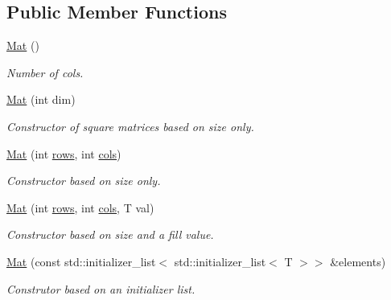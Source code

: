 \subsection*{Public Member Functions}
\begin{DoxyCompactItemize}
\item 
\mbox{\label{classtao_1_1deprecated_1_1_mat_af0fe0033ada296c7f0166b78e705ebc1}} 
\mbox{\hyperlink{classtao_1_1deprecated_1_1_mat_af0fe0033ada296c7f0166b78e705ebc1}{Mat}} ()
\begin{DoxyCompactList}\small\item\em Number of cols. \end{DoxyCompactList}\item 
\mbox{\hyperlink{classtao_1_1deprecated_1_1_mat_af505e5fdfcff8448c86fcf3d630c53a7}{Mat}} (int dim)
\begin{DoxyCompactList}\small\item\em Constructor of square matrices based on size only. \end{DoxyCompactList}\item 
\mbox{\hyperlink{classtao_1_1deprecated_1_1_mat_a9a367235a9d0a78d1e49cf6fdc09f620}{Mat}} (int \mbox{\hyperlink{classtao_1_1deprecated_1_1_mat_aefbe18686fd37ac1d5525196649282c8}{rows}}, int \mbox{\hyperlink{classtao_1_1deprecated_1_1_mat_a987003b3e2bc3cd6b9776c6bcaed8dd2}{cols}})
\begin{DoxyCompactList}\small\item\em Constructor based on size only. \end{DoxyCompactList}\item 
\mbox{\hyperlink{classtao_1_1deprecated_1_1_mat_a323565cac6c46d7ee9934bac2482ab1e}{Mat}} (int \mbox{\hyperlink{classtao_1_1deprecated_1_1_mat_aefbe18686fd37ac1d5525196649282c8}{rows}}, int \mbox{\hyperlink{classtao_1_1deprecated_1_1_mat_a987003b3e2bc3cd6b9776c6bcaed8dd2}{cols}}, T val)
\begin{DoxyCompactList}\small\item\em Constructor based on size and a fill value. \end{DoxyCompactList}\item 
\mbox{\hyperlink{classtao_1_1deprecated_1_1_mat_abcf01044a0340d535db6288087530adb}{Mat}} (const std\+::initializer\+\_\+list$<$ std\+::initializer\+\_\+list$<$ T $>$$>$ \&elements)
\begin{DoxyCompactList}\small\item\em Construtor based on an initializer list. \end{DoxyCompactList}\item 
$$
\end{DoxyCompactItemize}
